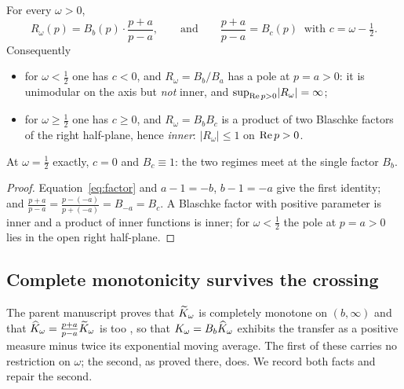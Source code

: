 \begin{proposition}\label{prop:twoblaschke}
For every $\omega>0$,
\begin{equation}\label{eq:twoblaschke}
 R_\omega(p)=B_b(p)\cdot\frac{p+a}{p-a},\qquad\text{and}\qquad
 \frac{p+a}{p-a}=B_c(p)\ \text{ with }c=\omega-\tfrac12 .
\end{equation}
Consequently
\begin{itemize}
\item for $\omega<\frac12$ one has $c<0$, and $R_\omega=B_b/B_a$ has a pole at
 $p=a>0$: it is unimodular on the axis but \emph{not} inner, and
 $\sup_{\operatorname{Re} p>0}\lvert R_\omega\rvert=\infty$;
\item for $\omega\ge\frac12$ one has $c\ge0$, and $R_\omega=B_bB_c$ is a product
 of two Blaschke factors of the right half-plane, hence \emph{inner}:
 $\lvert R_\omega\rvert\le1$ on $\operatorname{Re} p>0$.
\end{itemize}
At $\omega=\frac12$ exactly, $c=0$ and $B_c\equiv1$: the two regimes meet at the
single factor $B_b$.
\end{proposition}

\begin{proof}
Equation~\eqref{eq:factor} and $a-1=-b$, $b-1=-a$ give the first identity; and
$\frac{p+a}{p-a}=\frac{p-(-a)}{p+(-a)}=B_{-a}=B_c$. A Blaschke factor with
positive parameter is inner and a product of inner functions is inner; for
$\omega<\frac12$ the pole at $p=a>0$ lies in the open right half-plane.
\end{proof}

\subsection{Complete monotonicity survives the crossing}\label{sec:cmpast}

The parent manuscript proves that $\widetilde K_\omega$ is completely monotone on
$(b,\infty)$ \cite[Prop.~3.2]{Markov} and that
$\widehat K_\omega=\frac{p+a}{p-a}\widetilde K_\omega$ is too \cite[Prop.~3.6]{Markov}, so that
$K_\omega=B_b\widehat K_\omega$ exhibits the transfer as a positive measure minus twice
its exponential moving average. The first of these carries no restriction on
$\omega$; the second, as proved there, does. We record both facts and repair the
second.

